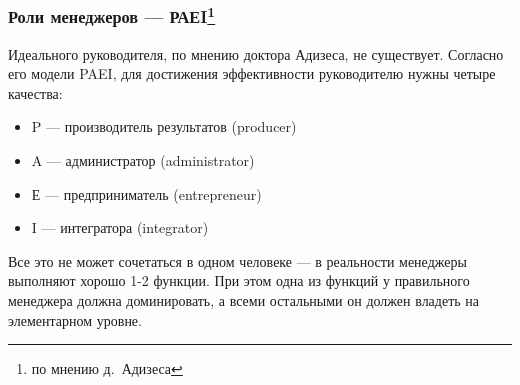 \documentclass{../industrial-development}
\begin{document}
\begin{frame} \frametitle{Роли менеджеров — РАЕI\footnote[2]{по мнению д.~Адизеса}}
	Идеального руководителя, по мнению доктора Адизеса, не существует. Согласно его модели PAEI, для достижения эффективности руководителю нужны четыре качества: 
 \begin{itemize}
	 \item \alert{P} — производитель результатов (producer) 
	 \item \alert{A} — администратор (administrator) 
	 \item \alert{Е} — предприниматель (entrepreneur) 
	 \item \alert{I} — интегратора (integrator)
 \end{itemize}
Все это не может сочетаться в одном человеке — в реальности менеджеры выполняют хорошо 1-2 функции. При этом одна из функций у правильного менеджера должна доминировать, а всеми остальными он должен владеть на элементарном уровне.  \\

\end{frame}
\lecturenotes
\end{document}
